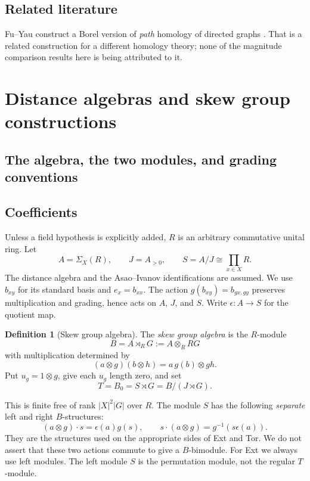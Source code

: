 \documentclass[11pt,a4paper]{article}
\newcommand{\defn}[1]{\textsl{\color{darkblue} #1}}
\numberwithin{equation}{section}
\theoremstyle{definition}
\newtheorem{definition}[theorem]{Definition}
\theoremstyle{remark}
\newcommand{\G}{G}
\newcommand{\coeff}{\subsection*{\color{darkblue}Coefficients}}
\begin{document}
\subsection*{\color{darkblue}Related literature}
Fu--Yau construct a Borel version of \emph{path} homology of directed
graphs \cite{FuYau}.  That is a related construction for a different
homology theory; none of the magnitude comparison results here is
being attributed to it.

\section{Distance algebras and skew group constructions}
\label{sec:skew}

\subsection{The algebra, the two modules, and grading conventions}

\coeff Unless a field hypothesis is explicitly added, $R$ is an
arbitrary commutative unital ring.  Let
\[
 A=\Sigma_X(R),\qquad J=A_{>0},\qquad S=A/J\cong\prod_{x\in X}R.
\]
The distance algebra and the Asao--Ivanov identifications are assumed.
We use $b_{xy}$ for its standard basis and $e_x=b_{xx}$.  The action
$g(b_{xy})=b_{gx,gy}$ preserves multiplication and grading, hence acts
on $A$, $J$, and $S$.  Write $\epsilon:A\to S$ for the quotient map.

\begin{definition}[Skew group algebra]
 The \defn{skew group algebra} is the $R$-module
 \[
  B=A\rtimes_R\G:=A\otimes_R R\G
 \]
 with multiplication determined by
 \[
  (a\otimes g)(b\otimes h)=a\,g(b)\otimes gh.
 \]
 Put $u_g=1\otimes g$, give each $u_g$ length zero, and set
 \begin{equation}\label{eq:T}
   T=B_0=S\rtimes\G=B/(J\rtimes\G).
 \end{equation}
\end{definition}
This is finite free of rank $|X|^2|\G|$ over $R$.  The module $S$
has the following \defn{separate} left and right $B$-structures:
\begin{equation}\label{eq:S-actions}
 (a\otimes g)\cdot s=\epsilon(a)g(s),\qquad
 s\cdot(a\otimes g)=g^{-1}(s\epsilon(a)).
\end{equation}
They are the structures used on the appropriate sides of Ext and Tor.
We do not assert that these two actions commute to give a $B$-bimodule.
For Ext we always use left modules.  The left module $S$ is the
permutation module, not the regular $T$-module.
\end{document}
